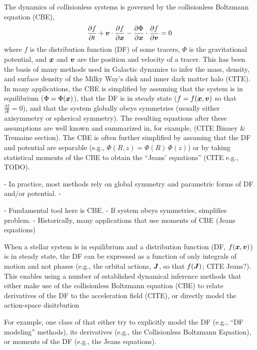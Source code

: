 The dynamics of collisionless systems is governed by the collisionless Boltzmann
equation (CBE),
\begin{equation}
    \frac{\partial f}{\partial t} + \boldsymbol{v} \cdot \frac{\partial f}{\partial \boldsymbol{x}} - \frac{\partial \Phi}{\partial \boldsymbol{x}} \cdot \frac{\partial f}{\partial \boldsymbol{v}} = 0
\end{equation}
where $f$ is the distribution function (DF) of some tracers, $\Phi$ is the gravitational
potential, and $\boldsymbol{x}$ and $\boldsymbol{v}$ are the position and velocity of a tracer.
This has been the basis of many methods used in Galactic dynamics to infer the mass,
density, and surface density of the Milky Way's disk and inner dark matter halo (CITE).
In many applications, the CBE is simplified by assuming that the system is in
equilibrium ($\Phi = \Phi(\boldsymbol{x})$), that the DF is in steady state ($f = f(\boldsymbol{x},
\boldsymbol{v})$ so that $\frac{\partial f}{\partial t}=0$), and that the system globally obeys
symmetries (usually either axisymmetry or spherical symmetry).
The resulting equations after these assumptions are well known and summarized in, for
example, (CITE Binney \& Tremaine section).
The CBE is often further simplified by assuming that the DF and potential are separable
(e.g., $\Phi(R, z) = \Phi(R) \, \Phi(z)$) or by taking statistical moments of the CBE to
obtain the ``Jeans' equations'' (CITE e.g., TODO).

- In practice, most methods rely on global symmetry and parametric forms of DF and/or potential.
-



- Fundamental tool here is CBE.
- If system obeys symmetries, simplifies problem.
- Historically, many applications that use moments of CBE (Jeans equations)

When a stellar system is in equilibrium and a distribution function (DF, $f(\boldsymbol{x},
\boldsymbol{v})$) is in steady state, the DF can be expressed as a function of only integrals of
motion and not phases (e.g., the orbital actions, $\boldsymbol{J}$, so that $f(\boldsymbol{J})$; CITE Jeans?).
This enables using a number of established dynamical inference methods that either make use of the collisionless Boltzmann equation (CBE) to relate derivatives of the DF to the acceleration field (CITE), or directly model the action-space disitrbution

For example, one class of
that either try
to explicitly model the DF (e.g., ``DF modeling'' methods), its derivatives (e.g., the
Collisionless Boltzmann Equation), or moments of the DF (e.g., the Jeans equations).

